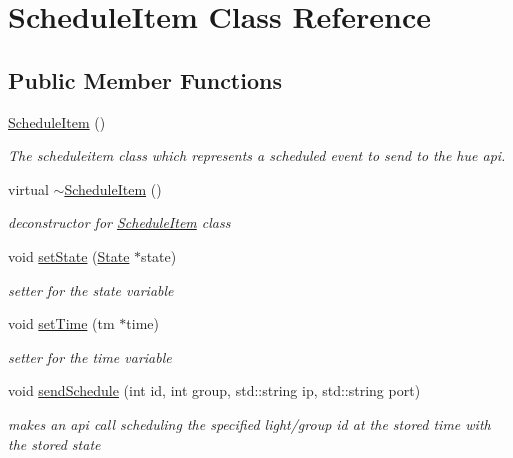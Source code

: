 \hypertarget{class_schedule_item}{}\section{Schedule\+Item Class Reference}
\label{class_schedule_item}
\subsection*{Public Member Functions}
\begin{DoxyCompactItemize}
\item 
\hyperlink{class_schedule_item_a8cbba55bd38a4f68bdec8c6d854a9359}{Schedule\+Item} ()
\begin{DoxyCompactList}\small\item\em The scheduleitem class which represents a scheduled event to send to the hue api. \end{DoxyCompactList}\item 
virtual \hyperlink{class_schedule_item_a1b3f5ec201516ee539349966bfa4c342}{$\sim$\+Schedule\+Item} ()
\begin{DoxyCompactList}\small\item\em deconstructor for \hyperlink{class_schedule_item}{Schedule\+Item} class \end{DoxyCompactList}\item 
void \hyperlink{class_schedule_item_a3582a8819347ee2e0a5ee550e718cb51}{set\+State} (\hyperlink{class_state}{State} $\ast$state)
\begin{DoxyCompactList}\small\item\em setter for the state variable \end{DoxyCompactList}\item 
void \hyperlink{class_schedule_item_a690b36b91bb76a8568550d9350cad2f5}{set\+Time} (tm $\ast$time)
\begin{DoxyCompactList}\small\item\em setter for the time variable \end{DoxyCompactList}\item 
void \hyperlink{class_schedule_item_ae7a664bd9f94a5a8dcd4394c0c2d046a}{send\+Schedule} (int id, int group, std\+::string ip, std\+::string port)
\begin{DoxyCompactList}\small\item\em makes an api call scheduling the specified light/group id at the stored time with the stored state \end{DoxyCompactList}\end{DoxyCompactItemize}
